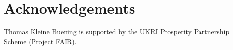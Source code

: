 

\section*{Acknowledgements} 
Thomas Kleine Buening is supported by the UKRI Prosperity Partnership Scheme (Project FAIR). 